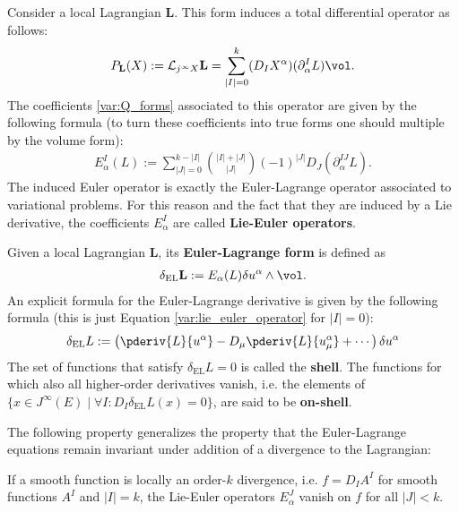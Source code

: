     \begin{example}
        Consider a local Lagrangian $\mathbf{L}$. This form induces a total differential operator as follows:
        \begin{gather}
            P_{\mathbf{L}}(X) := \mathcal{L}_{j^\infty X}\mathbf{L} = \sum_{|I|=0}^k(D_IX^\alpha)(\partial^I_\alpha L)\vol.
        \end{gather}
        The coefficients \eqref{var:Q_forms} associated to this operator are given by the following formula (to turn these coefficients into true forms one should multiple by the volume form):
        \begin{gather}
            \label{var:lie_euler_operator}
            E^I_\alpha(L) := \sum_{|J|=0}^{k-|I|}\binom{|I|+|J|}{|J|}(-1)^{|J|}D_J\left(\partial^{IJ}_\alpha L\right).
        \end{gather}
        The induced Euler operator is exactly the Euler-Lagrange operator associated to variational problems. For this reason and the fact that they are induced by a Lie derivative, the coefficients $E^I_\alpha$ are called \textbf{Lie-Euler operators}.

        Given a local Lagrangian $\mathbf{L}$, its \textbf{Euler-Lagrange form} is defined as
        \begin{gather}
            \delta_\mathrm{EL}\mathbf{L} := E_\alpha(L)\delta u^\alpha\wedge\vol.
        \end{gather}
        An explicit formula for the Euler-Lagrange derivative is given by the following formula (this is just Equation \eqref{var:lie_euler_operator} for $|I|=0$):
        \begin{gather}
            \label{var:euler_lagrange_derivative}
            \delta_\mathrm{EL}L := \left(\pderiv{L}{u^\alpha} - D_\mu\pderiv{L}{u^\alpha_\mu} + \cdots\right)\delta u^\alpha
        \end{gather}
        The set of functions that satisfy $\delta_\mathrm{EL}L=0$ is called the \textbf{shell}. The functions for which also all higher-order derivatives vanish, i.e. the elements of $\{x\in J^\infty(E)\mid\forall I:D_I\delta_\mathrm{EL}L(x) = 0\}$, are said to be \textbf{on-shell}.
    \end{example}

    The following property generalizes the property that the Euler-Lagrange equations remain invariant under addition of a divergence to the Lagrangian:
    \begin{property}[Divergences]\label{var:EL_operator_divergences}
        If a smooth function is locally an order-$k$ divergence, i.e. $f=D_IA^I$ for smooth functions $A^I$ and $|I|=k$, the Lie-Euler operators $E^J_\alpha$ vanish on $f$ for all $|J|<k$.
    \end{property}


